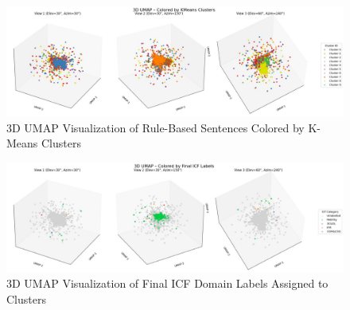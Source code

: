 \begin{table}[H]
\centering
\caption{Manual Inspection of Cluster Labels by ICF Category}
\label{tab:manual-inspection}
\end{table}

\begin{figure}[H]
\centering
\includegraphics[width=\textwidth]{images/Unsupervised_Results/rulebased_umap_clusters.jpg}
\caption{3D UMAP Visualization of Rule-Based Sentences Colored by K-Means Clusters}
\label{fig:rulebased-kmeans-umap}
\end{figure}

\begin{figure}[H]
\centering
\includegraphics[width=\textwidth]{images/Unsupervised_Results/rulebased_umap_icf_labels.jpg}
\caption{3D UMAP Visualization of Final ICF Domain Labels Assigned to Clusters}
\label{fig:rulebased-umap-icf}
\end{figure}

